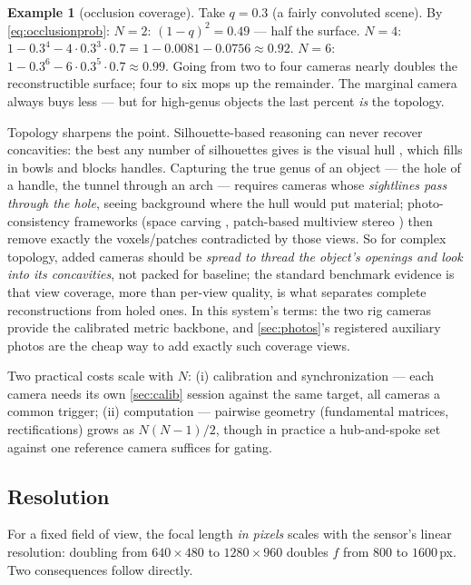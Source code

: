 \documentclass[11pt]{article}
\theoremstyle{definition}
\newtheorem{example}{Example}
\begin{document}
\begin{example}[occlusion coverage]
\label{ex:occlusion}
Take $q=0.3$ (a fairly convoluted scene). By \eqref{eq:occlusionprob}:
$N=2$: $(1-q)^2=0.49$ --- half the surface. $N=4$:
$1-0.3^4-4\cdot0.3^3\cdot0.7 = 1-0.0081-0.0756 \approx 0.92$. $N=6$:
$1-0.3^6-6\cdot0.3^5\cdot0.7 \approx 0.99$. Going from two to four cameras
nearly doubles the reconstructible surface; four to six mops up the
remainder. The marginal camera always buys less --- but for high-genus
objects the last percent \emph{is} the topology.
\end{example}

Topology sharpens the point. Silhouette-based reasoning can never recover
concavities: the best any number of silhouettes gives is the visual hull
\cite{Laurentini1994}, which fills in bowls and blocks handles. Capturing
the true genus of an object --- the hole of a handle, the tunnel through an
arch --- requires cameras whose \emph{sightlines pass through the hole},
seeing background where the hull would put material; photo-consistency
frameworks (space carving \cite{KutulakosSeitz2000}, patch-based multiview
stereo \cite{FurukawaPonce2010}) then remove exactly the voxels/patches
contradicted by those views. So for complex topology, added cameras should
be \emph{spread to thread the object's openings and look into its
concavities}, not packed for baseline; the standard benchmark evidence
\cite{Seitz2006} is that view coverage, more than per-view quality, is what
separates complete reconstructions from holed ones. In this system's terms:
the two rig cameras provide the calibrated metric backbone, and
\autoref{sec:photos}'s registered auxiliary photos are the cheap way to add
exactly such coverage views.

Two practical costs scale with $N$: (i) calibration and synchronization ---
each camera needs its own \autoref{sec:calib} session against the same
target, all cameras a common trigger; (ii) computation --- pairwise
geometry (fundamental matrices, rectifications) grows as $N(N{-}1)/2$,
though in practice a hub-and-spoke set against one reference camera
suffices for gating.

\subsection{Resolution}
\label{sec:resolution}

For a fixed field of view, the focal length \emph{in pixels} scales with
the sensor's linear resolution: doubling from $640\times480$ to
$1280\times960$ doubles $f$ from $800$ to $1600$\,px. Two consequences
follow directly.
\end{document}

